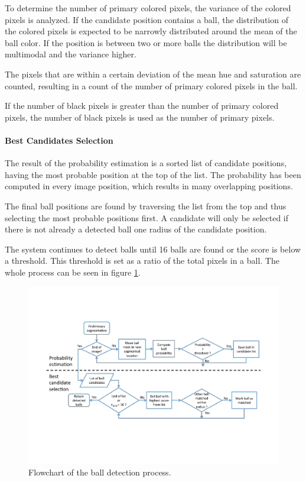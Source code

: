 To determine the number of primary colored pixels, the variance of the colored pixels is analyzed. If the candidate position contains a ball, the distribution of the colored pixels is expected to be narrowly distributed around the mean of the ball color. If the position is between two or more balls the distribution will be multimodal and the variance higher.

The pixels that are within a certain deviation of the mean hue and saturation are counted, resulting in a count of the number of primary colored pixels in the ball.

If the number of black pixels is greater than the number of primary colored pixels, the number of black pixels is used as the number of primary pixels.
\paragraph{Best Candidates Selection}
The result of the probability estimation is a sorted list of candidate positions, having the most probable position at the top of the list. The probability has been computed in every image position, which results in many overlapping positions. 

The final ball positions are found by traversing the list from the top and thus selecting the most probable positions first. A candidate will only be selected if there is not already a detected ball one radius of the candidate position.  

The system continues to detect balls until 16 balls are found or the score is below a threshold. This threshold is set as a ratio of the total pixels in a ball. The whole process can be seen in figure \ref{fig:ballflowchart}.

\begin{figure}[h]
\begin{center}
\includegraphics[width=\textwidth]{images/ballflowchart.pdf}
\caption{Flowchart of the ball detection process.}
\label{fig:ballflowchart}
\end{center}
\end{figure}

